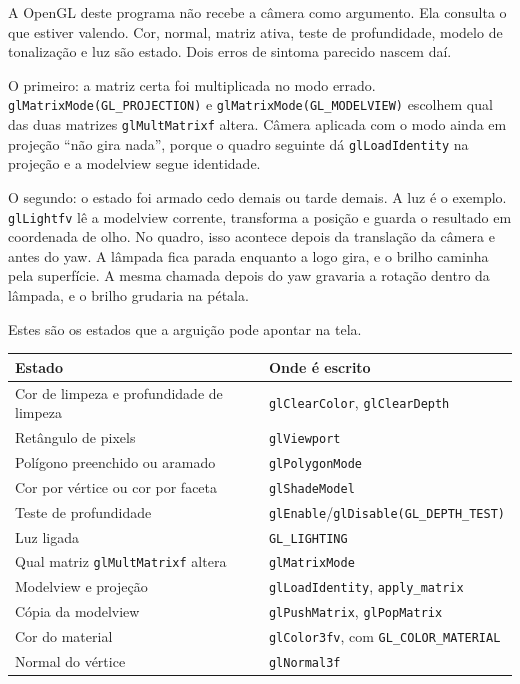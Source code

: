 \documentclass[11pt,a4paper]{article}
\newcommand{\fn}[1]{\texttt{\nobreak\hspace{0pt}#1}}
\begin{document}
A OpenGL deste programa não recebe a câmera como argumento. Ela consulta o que estiver valendo. Cor, normal, matriz ativa, teste de profundidade, modelo de tonalização e luz são estado. Dois erros de sintoma parecido nascem daí.

O primeiro: a matriz certa foi multiplicada no modo errado. \fn{glMatrixMode(GL\_PROJECTION)} e \fn{glMatrixMode(GL\_MODELVIEW)} escolhem qual das duas matrizes \fn{glMultMatrixf} altera. Câmera aplicada com o modo ainda em projeção ``não gira nada'', porque o quadro seguinte dá \fn{glLoadIdentity} na projeção e a modelview segue identidade.

O segundo: o estado foi armado cedo demais ou tarde demais. A luz é o exemplo. \fn{glLightfv} lê a modelview corrente, transforma a posição e guarda o resultado em coordenada de olho. No quadro, isso acontece depois da translação da câmera e antes do yaw. A lâmpada fica parada enquanto a logo gira, e o brilho caminha pela superfície. A mesma chamada depois do yaw gravaria a rotação dentro da lâmpada, e o brilho grudaria na pétala.

Estes são os estados que a arguição pode apontar na tela.

\begin{center}
\small
\begin{tabularx}{\linewidth}{@{}l X@{}}
\toprule
Estado & Onde é escrito \\
\midrule
Cor de limpeza e profundidade de limpeza & \fn{glClearColor}, \fn{glClearDepth} \\
Retângulo de pixels & \fn{glViewport} \\
Polígono preenchido ou aramado & \fn{glPolygonMode} \\
Cor por vértice ou cor por faceta & \fn{glShadeModel} \\
Teste de profundidade & \fn{glEnable}/\fn{glDisable(GL\_DEPTH\_TEST)} \\
Luz ligada & \fn{GL\_LIGHTING} \\
Qual matriz \fn{glMultMatrixf} altera & \fn{glMatrixMode} \\
Modelview e projeção & \fn{glLoadIdentity}, \fn{apply\_matrix} \\
Cópia da modelview & \fn{glPushMatrix}, \fn{glPopMatrix} \\
Cor do material & \fn{glColor3fv}, com \fn{GL\_COLOR\_MATERIAL} \\
Normal do vértice & \fn{glNormal3f} \\
\bottomrule
\end{tabularx}
\end{center}
\end{document}
